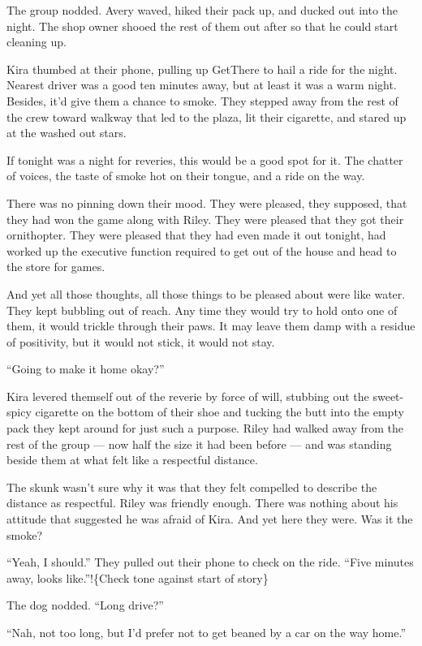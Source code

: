 The group nodded. Avery waved, hiked their pack up, and ducked out into the night. The shop owner shooed the rest of them out after so that he could start cleaning up.

Kira thumbed at their phone, pulling up GetThere to hail a ride for the night. Nearest driver was a good ten minutes away, but at least it was a warm night. Besides, it'd give them a chance to smoke. They stepped away from the rest of the crew toward walkway that led to the plaza, lit their cigarette, and stared up at the washed out stars.

If tonight was a night for reveries, this would be a good spot for it. The chatter of voices, the taste of smoke hot on their tongue, and a ride on the way.

There was no pinning down their mood. They were pleased, they supposed, that they had won the game along with Riley. They were pleased that they got their ornithopter. They were pleased that they had even made it out tonight, had worked up the executive function required to get out of the house and head to the store for games.

And yet all those thoughts, all those things to be pleased about were like water. They kept bubbling out of reach. Any time they would try to hold onto one of them, it would trickle through their paws. It may leave them damp with a residue of positivity, but it would not stick, it would not stay.

``Going to make it home okay?''

Kira levered themself out of the reverie by force of will, stubbing out the sweet-spicy cigarette on the bottom of their shoe and tucking the butt into the empty pack they kept around for just such a purpose. Riley had walked away from the rest of the group --- now half the size it had been before --- and was standing beside them at what felt like a respectful distance.

The skunk wasn't sure why it was that they felt compelled to describe the distance as respectful. Riley was friendly enough. There was nothing about his attitude that suggested he was afraid of Kira. And yet here they were. Was it the smoke?

``Yeah, I should.'' They pulled out their phone to check on the ride. ``Five minutes away, looks like.''!\{Check tone against start of story\}

The dog nodded. ``Long drive?''

``Nah, not too long, but I'd prefer not to get beaned by a car on the way home.''

